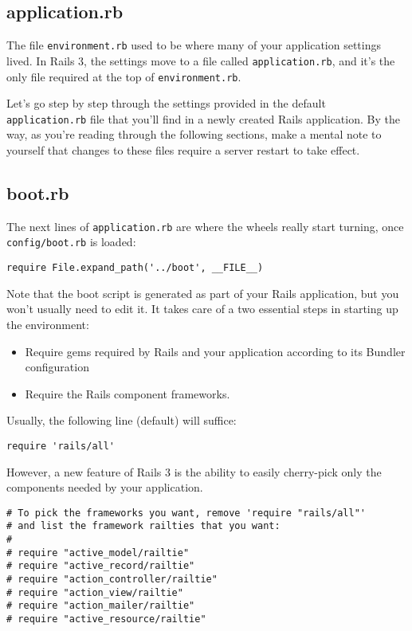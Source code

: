 \subsection{application.rb}
The file \verb|environment.rb| used to be where many of your
application settings lived. In Rails 3, the settings move to a file
called \verb|application.rb|, and it's the only file required at the
top of \verb|environment.rb|.

Let's go step by step through the settings provided in the default
\verb|application.rb| file that you'll find in a newly created Rails
application. By the way, as you're reading through the following
sections, make a mental note to yourself that changes to these files
require a server restart to take effect.

\subsection{boot.rb}
The next lines of \verb|application.rb| are where the wheels really
start turning, once \verb|config/boot.rb| is loaded:

\begin{code}
\begin{Verbatim}
require File.expand_path('../boot', __FILE__)
\end{Verbatim}
\end{code}
Note that the boot script is generated as part of your Rails
application, but you won't usually need to edit it. It takes care of a
two essential steps in starting up the environment:

\begin{itemize}
\item Require gems required by Rails and your application according to its
Bundler configuration

\item Require the Rails component frameworks.

\end{itemize}
Usually, the following line (default) will suffice:

\begin{code}
\begin{Verbatim}
require 'rails/all'
\end{Verbatim}
\end{code}
However, a new feature of Rails 3 is the ability to easily cherry-pick
only the components needed by your application.

\begin{code}
\begin{Verbatim}
# To pick the frameworks you want, remove 'require "rails/all"'
# and list the framework railties that you want:
#
# require "active_model/railtie"
# require "active_record/railtie"
# require "action_controller/railtie"
# require "action_view/railtie"
# require "action_mailer/railtie"
# require "active_resource/railtie"
\end{Verbatim}
\end{code}
